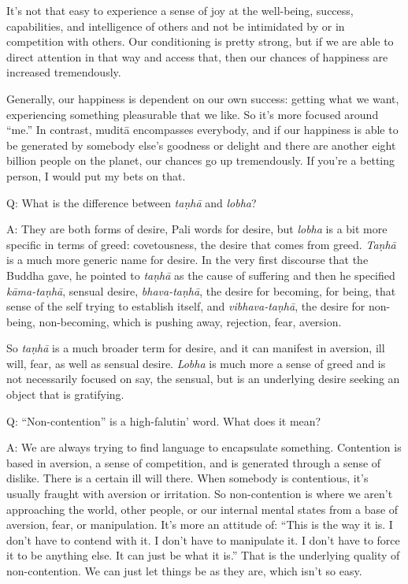 It’s not that easy to experience a sense of joy at the well-being,
success, capabilities, and intelligence of others and not be intimidated
by or in competition with others. Our conditioning is pretty strong, but
if we are able to direct attention in that way and access that, then our
chances of happiness are increased tremendously.

Generally, our happiness is dependent on our own success: getting what
we want, experiencing something pleasurable that we like. So it’s more
focused around “me.” In contrast, muditā encompasses everybody, and if
our happiness is able to be generated by somebody else’s goodness or
delight and there are another eight billion people on the planet, our
chances go up tremendously. If you’re a betting person, I would put my
bets on that.

\qaspace
Q: What is the difference between \emph{taṇhā} and \emph{lobha}?

\qaspace
A: They are both forms of desire, Pali words for desire, but
\emph{lobha} is a bit more specific in terms of greed: covetousness, the
desire that comes from greed. \emph{Taṇhā} is a much more generic name
for desire. In the very first discourse that the Buddha gave, he pointed
to \emph{taṇhā} as the cause of suffering and then he specified
\emph{kāma-taṇhā}, sensual desire, \emph{bhava-taṇhā}, the desire for
becoming, for being, that sense of the self trying to establish itself,
and \emph{vibhava-taṇhā}, the desire for non-being, non-becoming, which
is pushing away, rejection, fear, aversion.

So \emph{taṇhā} is a much broader term for desire, and it can manifest
in aversion, ill will, fear, as well as sensual desire. \emph{Lobha} is
much more a sense of greed and is not necessarily focused on say, the
sensual, but is an underlying desire seeking an object that is
gratifying.

\qaspace
Q: “Non-contention” is a high-falutin’ word. What does it mean?

\qaspace
A: We are always trying to find language to encapsulate something.
Contention is based in aversion, a sense of competition, and is
generated through a sense of dislike. There is a certain ill will there.
When somebody is contentious, it’s usually fraught with aversion or
irritation. So non-contention is where we aren’t approaching the world,
other people, or our internal mental states from a base of aversion,
fear, or manipulation. It’s more an attitude of: “This is the way it is.
I don’t have to contend with it. I don’t have to manipulate it. I don’t
have to force it to be anything else. It can just be what it is.” That
is the underlying quality of non-contention. We can just let things be
as they are, which isn’t so easy.

